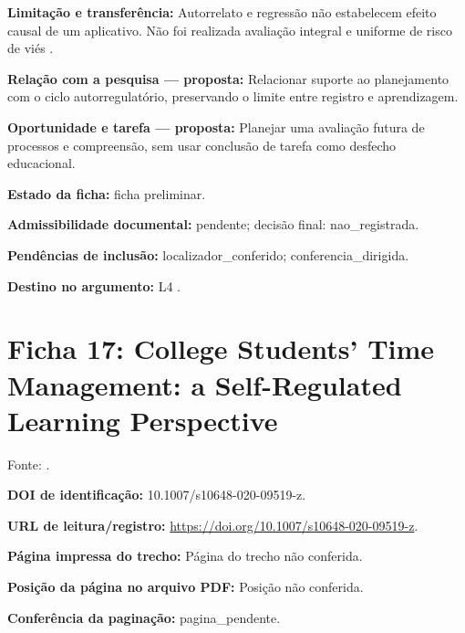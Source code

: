 \noindent\textbf{Limitação e transferência:} Autorrelato e regressão não estabelecem efeito causal de um aplicativo. Não foi realizada avaliação integral e uniforme de risco de viés \citep{education_wolters2017}.\par\medskip

\noindent\textbf{Relação com a pesquisa — proposta:} Relacionar suporte ao planejamento com o ciclo autorregulatório, preservando o limite entre registro e aprendizagem.\par\medskip

\noindent\textbf{Oportunidade e tarefa — proposta:} Planejar uma avaliação futura de processos e compreensão, sem usar conclusão de tarefa como desfecho educacional.\par\medskip

\noindent\textbf{Estado da ficha:} ficha preliminar.\par\medskip

\noindent\textbf{Admissibilidade documental:} pendente; decisão final: nao\_registrada.\par\medskip

\noindent\textbf{Pendências de inclusão:} localizador\_conferido; conferencia\_dirigida.\par\medskip

\noindent\textbf{Destino no argumento:} L4 .

\clearpage\section*{Ficha 17: College Students’ Time Management: a Self-Regulated Learning Perspective}

Fonte: \citet{education_wolters2021}.

\noindent\textbf{DOI de identificação:} 10.1007/s10648-020-09519-z.\par\medskip

\noindent\textbf{URL de leitura/registro:} \url{https://doi.org/10.1007/s10648-020-09519-z}.\par\medskip

\noindent\textbf{Página impressa do trecho:} Página do trecho não conferida.\par\medskip

\noindent\textbf{Posição da página no arquivo PDF:} Posição não conferida.\par\medskip

\noindent\textbf{Conferência da paginação:} pagina\_pendente.\par\medskip

